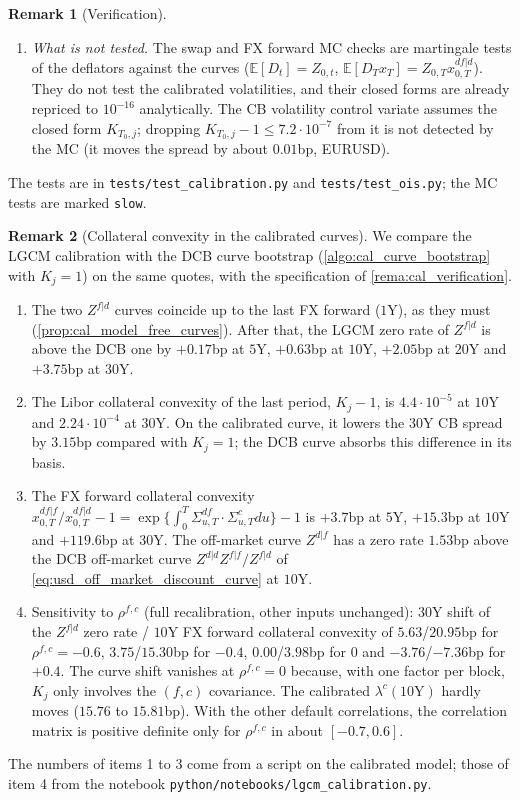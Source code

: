 \documentclass[11pt,english]{amsart}
\newcommand{\EE}{\mathbb{E}}
\theoremstyle{definition}
\newtheorem{rema}{Remark}
\begin{document}
\begin{rema}[Verification]
\begin{enumerate}
\item \emph{What is not tested.} The swap and FX forward MC checks are martingale tests of the deflators against the curves ($\EE[D_t] = Z_{0,t}$, $\EE[D_Tx_T] = Z_{0,T}x^{df|d}_{0,T}$). They do not test the calibrated volatilities, and their closed forms are already repriced to $10^{-16}$ analytically. The CB volatility control variate assumes the closed form $K_{T_0,j}$; dropping $K_{T_0,j}-1\le7.2\cdot10^{-7}$ from it is not detected by the MC (it moves the spread by about $0.01$bp, EURUSD).
\end{enumerate}
The tests are in \texttt{tests/test\_calibration.py} and \texttt{tests/test\_ois.py}; the MC tests are marked \texttt{slow}.
\end{rema}

\begin{rema}[Collateral convexity in the calibrated curves]\label{rema:cal_collateral_convexity}
We compare the LGCM calibration with the DCB curve bootstrap (\autoref{algo:cal_curve_bootstrap} with $K_j = 1$) on the same quotes, with the specification of \autoref{rema:cal_verification}.
\begin{enumerate}
\item The two $Z^{f|d}$ curves coincide up to the last FX forward ($1$Y), as they must (\autoref{prop:cal_model_free_curves}). After that, the LGCM zero rate of $Z^{f|d}$ is above the DCB one by $+0.17$bp at $5$Y, $+0.63$bp at $10$Y, $+2.05$bp at $20$Y and $+3.75$bp at $30$Y.
\item The Libor collateral convexity of the last period, $K_j - 1$, is $4.4\cdot10^{-5}$ at $10$Y and $2.24\cdot10^{-4}$ at $30$Y. On the calibrated curve, it lowers the $30$Y CB spread by $3.15$bp compared with $K_j = 1$; the DCB curve absorbs this difference in its basis.
\item The FX forward collateral convexity $x^{df|f}_{0,T}/x^{df|d}_{0,T} - 1 = \exp\{\int_0^T\Sigma^{df}_{u,T}\cdot\Sigma^c_{u,T}du\} - 1$ is $+3.7$bp at $5$Y, $+15.3$bp at $10$Y and $+119.6$bp at $30$Y. The off-market curve $Z^{d|f}$ has a zero rate $1.53$bp above the DCB off-market curve $Z^{d|d}Z^{f|f}/Z^{f|d}$ of \eqref{eq:usd_off_market_discount_curve} at $10$Y.
\item Sensitivity to $\rho^{f,c}$ (full recalibration, other inputs unchanged): $30$Y shift of the $Z^{f|d}$ zero rate / $10$Y FX forward collateral convexity of $5.63$/$20.95$bp for $\rho^{f,c} = -0.6$, $3.75$/$15.30$bp for $-0.4$, $0.00$/$3.98$bp for $0$ and $-3.76$/$-7.36$bp for $+0.4$. The curve shift vanishes at $\rho^{f,c} = 0$ because, with one factor per block, $K_j$ only involves the $(f,c)$ covariance. The calibrated $\lambda^c(10\mathrm{Y})$ hardly moves ($15.76$ to $15.81$bp). With the other default correlations, the correlation matrix is positive definite only for $\rho^{f,c}$ in about $[-0.7,0.6]$.
\end{enumerate}
The numbers of items 1 to 3 come from a script on the calibrated model; those of item 4 from the notebook \texttt{python/notebooks/lgcm\_calibration.py}.
\end{rema}
\end{document}
